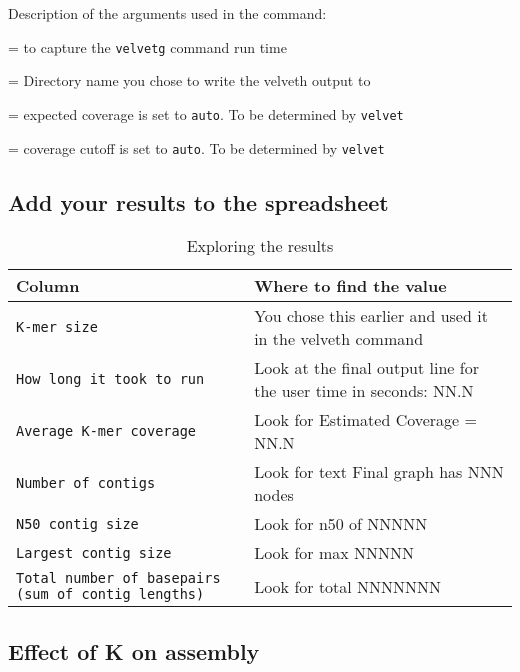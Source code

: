 Description of the arguments used in the command:
\begin{description}[style=multiline,labelindent=0cm,align=right,leftmargin=\descriptionlabelspace,rightmargin=1.5cm,font=\ttfamily]
  \item[time] = to capture the \texttt{velvetg} command run time
  \item[DIR] = Directory name you chose to write the velveth output to
  \item[-exp\_cov] = expected coverage is set to \texttt{auto}. To be determined by \texttt{velvet}
  \item[-cov\_cutoff] = coverage cutoff is set to \texttt{auto}. To be determined by \texttt{velvet}
\end{description}

\subsection{Add your results to the spreadsheet}


\begin{table}[H]
  \centering
  \caption{Exploring the results}
    \begin{tabular}{ll}
    \toprule
    \textbf{Column} & \textbf{Where to find the value} \\
    \midrule
    \texttt{K-mer size} & You chose this earlier and used it in the velveth command \\
    \texttt{How long it took to run} & Look at the final output line for the user time in seconds: NN.N\\
    \texttt{Average K-mer coverage } & Look for Estimated Coverage = NN.N\\
    \texttt{Number of contigs} & Look for text Final graph has NNN nodes\\
    \texttt{N50 contig size} & Look for n50 of NNNNN\\
    \texttt{Largest contig size} & Look for max NNNNN\\
    \texttt{Total number of basepairs (sum of contig lengths)} & Look for total NNNNNNN\\
    \bottomrule
    \end{tabular}
  \label{tab:results}
\end{table}


\subsection{Effect of K on assembly}

